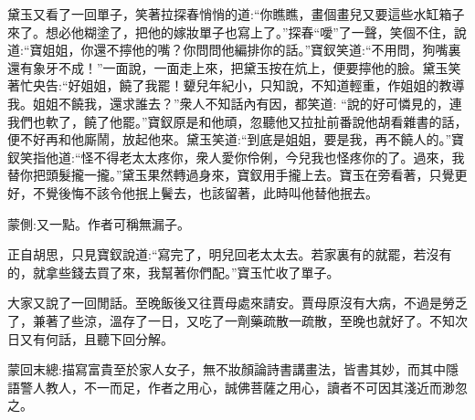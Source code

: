 \begin{parag}
    黛玉又看了一回單子，笑著拉探春悄悄的道:“你瞧瞧，畫個畫兒又要這些水缸箱子來了。想必他糊塗了，把他的嫁妝單子也寫上了。”探春“噯”了一聲，笑個不住，說道:“寶姐姐，你還不擰他的嘴？你問問他編排你的話。”寶釵笑道:“不用問，狗嘴裏還有象牙不成！”一面說，一面走上來，把黛玉按在炕上，便要擰他的臉。黛玉笑著忙央告:“好姐姐，饒了我罷！顰兒年紀小，只知說，不知道輕重，作姐姐的教導我。姐姐不饒我，還求誰去？”衆人不知話內有因，都笑道: “說的好可憐見的，連我們也軟了，饒了他罷。”寶釵原是和他頑，忽聽他又拉扯前番說他胡看雜書的話，便不好再和他廝鬧，放起他來。黛玉笑道:“到底是姐姐，要是我，再不饒人的。”寶釵笑指他道:“怪不得老太太疼你，衆人愛你伶俐，今兒我也怪疼你的了。過來，我替你把頭髮攏一攏。”黛玉果然轉過身來，寶釵用手攏上去。寶玉在旁看著，只覺更好，不覺後悔不該令他抿上鬢去，也該留著，此時叫他替他抿去。\begin{note}蒙側:又一點。作者可稱無漏子。\end{note}正自胡思，只見寶釵說道:“寫完了，明兒回老太太去。若家裏有的就罷，若沒有的，就拿些錢去買了來，我幫著你們配。”寶玉忙收了單子。
\end{parag}


\begin{parag}
    大家又說了一回閒話。至晚飯後又往賈母處來請安。賈母原沒有大病，不過是勞乏了，兼著了些涼，溫存了一日，又吃了一劑藥疏散一疏散，至晚也就好了。不知次日又有何話，且聽下回分解。
\end{parag}


\begin{parag}
    \begin{note}蒙回末總:描寫富貴至於家人女子，無不妝顏論詩書講畫法，皆書其妙，而其中隱語警人教人，不一而足，作者之用心，誠佛菩薩之用心，讀者不可因其淺近而渺忽之。\end{note}
\end{parag}

